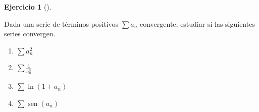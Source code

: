 \documentclass[
  a4paper,
]{scrreport}
\theoremstyle{definition}
\newtheorem{exercise}{Ejercicio}[chapter]
\theoremstyle{remark}
\begin{document}
\begin{exercise}[]\protect\hypertarget{exr-series-positivas-convergentes}{}\label{exr-series-positivas-convergentes}

Dada una serie de términos positivos \(\sum a_n\) convergente, estudiar
si las siguientes series convergen.

\begin{enumerate}
\def\labelenumi{\alph{enumi}.}
\item
  \(\sum a_n^2\)
\item
  \(\sum \frac{1}{a_n^3}\)
\item
  \(\sum \ln(1+a_n)\)
\item
  \(\sum \operatorname{sen}(a_n)\)
\end{enumerate}

\end{exercise}
\end{document}
